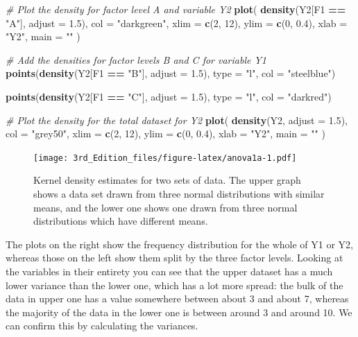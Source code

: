 \documentclass[
]{book}
\newenvironment{Shaded}{\begin{snugshade}}{\end{snugshade}}
\newcommand{\CommentTok}[1]{\textcolor[rgb]{0.56,0.35,0.01}{\textit{#1}}}
\newcommand{\DataTypeTok}[1]{\textcolor[rgb]{0.13,0.29,0.53}{#1}}
\newcommand{\DecValTok}[1]{\textcolor[rgb]{0.00,0.00,0.81}{#1}}
\newcommand{\FloatTok}[1]{\textcolor[rgb]{0.00,0.00,0.81}{#1}}
\newcommand{\KeywordTok}[1]{\textcolor[rgb]{0.13,0.29,0.53}{\textbf{#1}}}
\newcommand{\NormalTok}[1]{#1}
\newcommand{\OperatorTok}[1]{\textcolor[rgb]{0.81,0.36,0.00}{\textbf{#1}}}
\newcommand{\StringTok}[1]{\textcolor[rgb]{0.31,0.60,0.02}{#1}}
\begin{document}
\begin{Shaded}
\begin{Highlighting}[]
\CommentTok{# Plot the density for factor level A and variable Y2}
\KeywordTok{plot}\NormalTok{(}
  \KeywordTok{density}\NormalTok{(Y2[F1 }\OperatorTok{==}\StringTok{ "A"}\NormalTok{], }\DataTypeTok{adjust =} \FloatTok{1.5}\NormalTok{),}
  \DataTypeTok{col =} \StringTok{"darkgreen"}\NormalTok{,}
  \DataTypeTok{xlim =} \KeywordTok{c}\NormalTok{(}\DecValTok{2}\NormalTok{, }\DecValTok{12}\NormalTok{),}
  \DataTypeTok{ylim =} \KeywordTok{c}\NormalTok{(}\DecValTok{0}\NormalTok{, }\FloatTok{0.4}\NormalTok{),}
  \DataTypeTok{xlab =} \StringTok{"Y2"}\NormalTok{,}
  \DataTypeTok{main =} \StringTok{""}
\NormalTok{)}

\CommentTok{# Add the densities for factor levels B and C for variable Y1}
\KeywordTok{points}\NormalTok{(}\KeywordTok{density}\NormalTok{(Y2[F1 }\OperatorTok{==}\StringTok{ "B"}\NormalTok{], }\DataTypeTok{adjust =} \FloatTok{1.5}\NormalTok{), }
       \DataTypeTok{type =} \StringTok{"l"}\NormalTok{, }\DataTypeTok{col =} \StringTok{"steelblue"}\NormalTok{)}

\KeywordTok{points}\NormalTok{(}\KeywordTok{density}\NormalTok{(Y2[F1 }\OperatorTok{==}\StringTok{ "C"}\NormalTok{], }\DataTypeTok{adjust =} \FloatTok{1.5}\NormalTok{), }
       \DataTypeTok{type =} \StringTok{"l"}\NormalTok{, }\DataTypeTok{col =} \StringTok{"darkred"}\NormalTok{)}

\CommentTok{# Plot the density for the total dataset for Y2}
\KeywordTok{plot}\NormalTok{(}
  \KeywordTok{density}\NormalTok{(Y2, }\DataTypeTok{adjust =} \FloatTok{1.5}\NormalTok{),}
  \DataTypeTok{col =} \StringTok{"grey50"}\NormalTok{,}
  \DataTypeTok{xlim =} \KeywordTok{c}\NormalTok{(}\DecValTok{2}\NormalTok{, }\DecValTok{12}\NormalTok{),}
  \DataTypeTok{ylim =} \KeywordTok{c}\NormalTok{(}\DecValTok{0}\NormalTok{, }\FloatTok{0.4}\NormalTok{),}
  \DataTypeTok{xlab =} \StringTok{"Y2"}\NormalTok{,}
  \DataTypeTok{main =} \StringTok{""}
\NormalTok{)}
\end{Highlighting}
\end{Shaded}

\begin{figure}
\centering
\texttt{[image: 3rd\_Edition\_files/figure-latex/anova1a-1.pdf]}
\caption{\label{fig:anova1a}Kernel density estimates for two sets of data. The upper graph shows a data set drawn from three normal distributions with similar means, and the lower one shows one drawn from three normal distributions which have different means.}
\end{figure}

The plots on the right show the frequency distribution for the whole of Y1 or Y2, whereas those on the left show them split by the three factor levels. Looking at the variables in their entirety you can see that the upper dataset has a much lower variance than the lower one, which has a lot more spread: the bulk of the data in upper one has a value somewhere between about 3 and about 7, whereas the majority of the data in the lower one is between around 3 and around 10. We can confirm this by calculating the variances.
\end{document}

